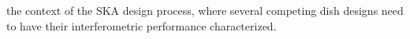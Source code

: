 \documentclass{aa}
\begin{document}
% 
the context of the SKA design process, where several competing dish designs need to have their interferometric performance characterized.
% 
% 
% 
\end{document}
